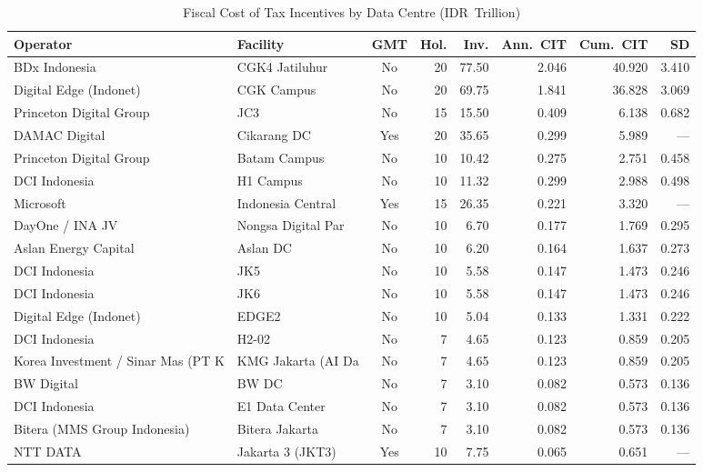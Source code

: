\documentclass[11pt,english]{article}
\begin{document}
\begin{table}[H]
\centering
\caption{Fiscal Cost of Tax Incentives by Data Centre (IDR~Trillion)}
\label{tab:perdc}
\begin{threeparttable}
\scriptsize
\begin{tabular}{l l c r r r r r}
\toprule
\textbf{Operator} & \textbf{Facility} & \textbf{GMT} & \textbf{Hol.} & \textbf{Inv.} & \textbf{Ann.\ CIT} & \textbf{Cum.\ CIT} & \textbf{SD} \\
\midrule
  BDx Indonesia & CGK4 Jatiluhur & No & 20 & 77.50 & 2.046 & 40.920 & 3.410 \\
  Digital Edge (Indonet) & CGK Campus & No & 20 & 69.75 & 1.841 & 36.828 & 3.069 \\
  Princeton Digital Group & JC3 & No & 15 & 15.50 & 0.409 & 6.138 & 0.682 \\
  DAMAC Digital & Cikarang DC & Yes & 20 & 35.65 & 0.299 & 5.989 & --- \\
  Princeton Digital Group & Batam Campus & No & 10 & 10.42 & 0.275 & 2.751 & 0.458 \\
  DCI Indonesia & H1 Campus & No & 10 & 11.32 & 0.299 & 2.988 & 0.498 \\
  Microsoft & Indonesia Central  & Yes & 15 & 26.35 & 0.221 & 3.320 & --- \\
  DayOne / INA JV & Nongsa Digital Par & No & 10 & 6.70 & 0.177 & 1.769 & 0.295 \\
  Aslan Energy Capital & Aslan DC & No & 10 & 6.20 & 0.164 & 1.637 & 0.273 \\
  DCI Indonesia & JK5 & No & 10 & 5.58 & 0.147 & 1.473 & 0.246 \\
  DCI Indonesia & JK6 & No & 10 & 5.58 & 0.147 & 1.473 & 0.246 \\
  Digital Edge (Indonet) & EDGE2 & No & 10 & 5.04 & 0.133 & 1.331 & 0.222 \\
  DCI Indonesia & H2-02 & No & 7 & 4.65 & 0.123 & 0.859 & 0.205 \\
  Korea Investment / Sinar Mas (PT K & KMG Jakarta (AI Da & No & 7 & 4.65 & 0.123 & 0.859 & 0.205 \\
  BW Digital & BW DC & No & 7 & 3.10 & 0.082 & 0.573 & 0.136 \\
  DCI Indonesia & E1 Data Center & No & 7 & 3.10 & 0.082 & 0.573 & 0.136 \\
  Bitera (MMS Group Indonesia) & Bitera Jakarta & No & 7 & 3.10 & 0.082 & 0.573 & 0.136 \\
  NTT DATA & Jakarta 3 (JKT3) & Yes & 10 & 7.75 & 0.065 & 0.651 & --- \\

\end{tabular}
\end{threeparttable}
\end{table}
\end{document}
